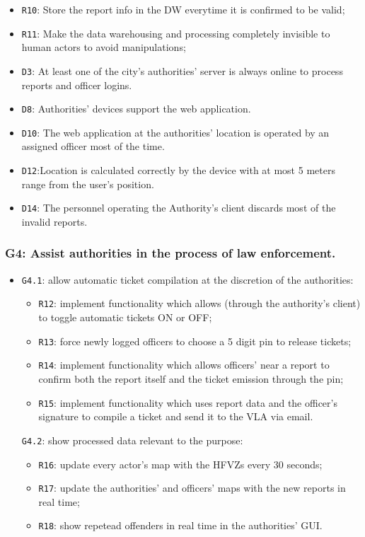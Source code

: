 \documentclass[12pt,a4paper]{article}
\begin{document}
	\begin{itemize}
			\item \texttt{R10}: Store the report info in the DW everytime it is confirmed to be valid;
			\item \texttt{R11}: Make the data warehousing  and processing completely invisible to human actors to avoid manipulations;
	\end{itemize}
	
	\begin{itemize}
			\item \texttt{D3}: At least one of the city's authorities' server is always online to process reports and officer logins.
			\item \texttt{D8}: Authorities' devices support the web application.
			\item \texttt{D10}: The web application at the authorities' location is operated by an assigned officer most of the time.
			\item \texttt{D12}:Location is calculated correctly by the device with at most 5 meters range from the user's position.
			\item \texttt{D14}: The personnel operating the Authority's client discards most of the invalid reports.
	\end{itemize}

\subsubsection{G4:  Assist authorities in the process of law enforcement.}
	
	\begin{itemize}
	\item \texttt{G4.1}: allow automatic ticket compilation at the discretion of the authorities:
							\begin{itemize}
									\item \texttt{R12}: implement functionality which allows (through the authority's client) to toggle automatic tickets ON or OFF;
									\item \texttt{R13}: force newly logged officers to choose a 5 digit pin to release tickets;
									\item \texttt{R14}: implement functionality which allows officers' near a report to confirm both the report itself and the ticket emission through the pin;
									\item \texttt{R15}: implement functionality which uses report data and the officer's signature to compile a ticket and send it to the VLA via email.
							\end{itemize}
	\texttt{G4.2}: show processed data relevant to the purpose:
							\begin{itemize}
									\item \texttt{R16}: update every actor's map with the HFVZs every 30 seconds;
									\item \texttt{R17}: update the authorities' and officers' maps with the new reports in real time;
									\item \texttt{R18}: show repetead offenders in real time in the authorities' GUI.
							\end{itemize}
	\end{itemize}
	
\end{document}
